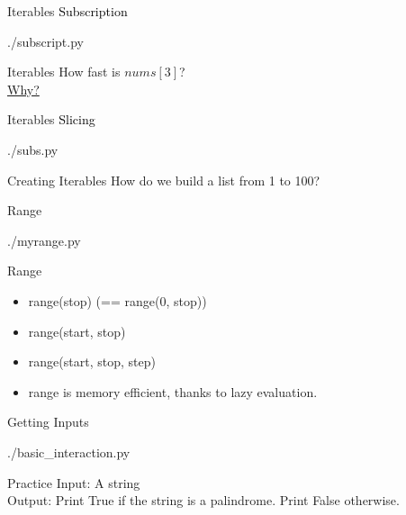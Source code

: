 \documentclass{beamer}
\begin{document}
\begin{frame}{Iterables}
  \textcolor{black}{\large{Subscription}}
  \begin{lstinputlisting}
    {./subscript.py}
  \end{lstinputlisting}
\end{frame}

\begin{frame}{Iterables}
  How fast is $nums[3]$?\\
  \href{https://stackoverflow.com/questions/23103690/why-is-accessing-any-single-element-in-an-array-done-in-constant-time-o1}{Why?}
\end{frame}

\begin{frame}{Iterables}
  \textcolor{black}{\large{Slicing}}
  \begin{lstinputlisting}
    {./subs.py}
  \end{lstinputlisting}
\end{frame}

\begin{frame}{Creating Iterables}
  How do we build a list from 1 to 100?
\end{frame}

\begin{frame}{Range}
  \begin{lstinputlisting}
    {./myrange.py}
  \end{lstinputlisting}
\end{frame}

\begin{frame}{Range}
  \begin{itemize}
    \item range(stop) (== range(0, stop))
    \item range(start, stop)
    \item range(start, stop, step)
    \item range is memory efficient, thanks to lazy evaluation.
  \end{itemize}
\end{frame}

\begin{frame}{Getting Inputs}
  \begin{lstinputlisting}
    {./basic_interaction.py}
  \end{lstinputlisting}
\end{frame}

\begin{frame}{Practice}
  Input: A string\\
  Output: Print True if the string is a palindrome. Print False otherwise.
\end{frame}
\end{document}
